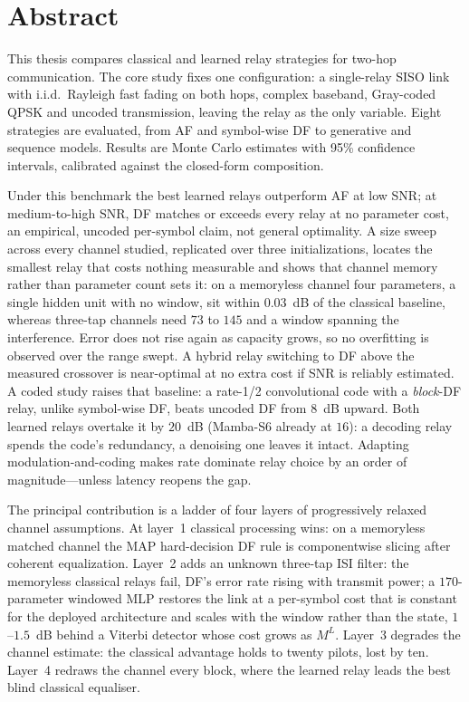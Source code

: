\chapter*{Abstract}

\label{sec:abstract-english}

This thesis compares classical and learned relay strategies for two-hop communication. The core study fixes one configuration: a single-relay SISO link with i.i.d.\ Rayleigh fast fading on both hops, complex baseband, Gray-coded QPSK and uncoded transmission, leaving the relay as the only variable. Eight strategies are evaluated, from AF and symbol-wise DF to generative and sequence models. Results are Monte Carlo estimates with 95\% confidence intervals, calibrated against the closed-form composition.

Under this benchmark the best learned relays outperform AF at low SNR; at medium-to-high SNR, DF matches or exceeds every relay at no parameter cost, an empirical, uncoded per-symbol claim, not general optimality. A size sweep across every channel studied, replicated over three initializations, locates the smallest relay that costs nothing measurable and shows that channel memory rather than parameter count sets it: on a memoryless channel four parameters, a single hidden unit with no window, sit within $0.03$~dB of the classical baseline, whereas three-tap channels need $73$ to $145$ and a window spanning the interference. Error does not rise again as capacity grows, so no overfitting is observed over the range swept. A hybrid relay switching to DF above the measured crossover is near-optimal at no extra cost if SNR is reliably estimated. A coded study raises that baseline: a rate-1/2 convolutional code with a \emph{block}-DF relay, unlike symbol-wise DF, beats uncoded DF from $8$~dB upward. Both learned relays overtake it by $20$~dB (Mamba-S6 already at $16$): a decoding relay spends the code's redundancy, a denoising one leaves it intact. Adapting modulation-and-coding makes rate dominate relay choice by an order of magnitude---unless latency reopens the gap.

The principal contribution is a ladder of four layers of progressively relaxed channel assumptions. At layer~1 classical processing wins: on a memoryless matched channel the MAP hard-decision DF rule is componentwise slicing after coherent equalization. Layer~2 adds an unknown three-tap ISI filter: the memoryless classical relays fail, DF's error rate rising with transmit power; a $170$-parameter windowed MLP restores the link at a per-symbol cost that is constant for the deployed architecture and scales with the window rather than the state, $1$--$1.5$~dB behind a Viterbi detector whose cost grows as $M^{L}$. Layer~3 degrades the channel estimate: the classical advantage holds to twenty pilots, lost by ten. Layer~4 redraws the channel every block, where the learned relay leads the best blind classical equaliser.

